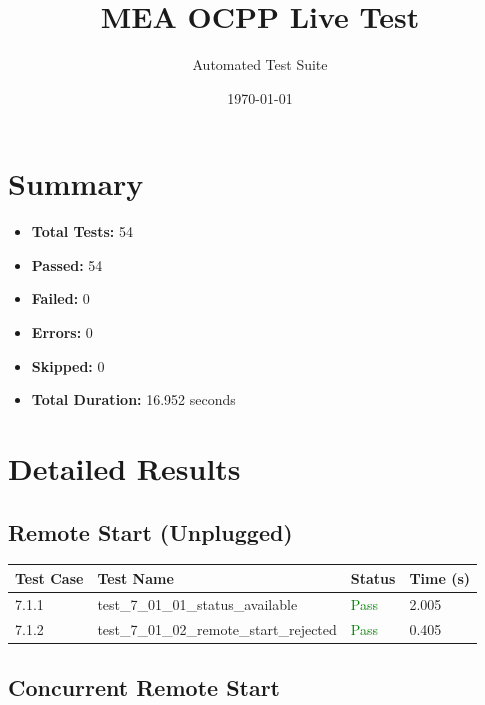 \documentclass{article}
\title{MEA OCPP Live Test}
\author{Automated Test Suite}
\date{\today}
\begin{document}
\maketitle

\section{Summary}
\begin{itemize}
    \item \textbf{Total Tests:} 54
    \item \textbf{Passed:} 54
    \item \textbf{Failed:} 0
    \item \textbf{Errors:} 0
    \item \textbf{Skipped:} 0
    \item \textbf{Total Duration:} 16.952 seconds
\end{itemize}

\section{Detailed Results}
\subsection{Remote Start (Unplugged)}

\begin{longtable}{p{} p{} p{} p{}}
\toprule
\textbf{Test Case} & \textbf{Test Name} & \textbf{Status} & \textbf{Time (s)} \\
\midrule
\endhead
7.1.1 & test\_7\_01\_01\_status\_available & \textcolor{green}{Pass} & 2.005 \\
7.1.2 & test\_7\_01\_02\_remote\_start\_rejected & \textcolor{green}{Pass} & 0.405 \\
\bottomrule
\end{longtable}
\subsection{Concurrent Remote Start}
\end{document}
